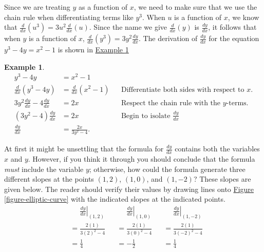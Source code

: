 \documentclass[12pt,]{book}
\theoremstyle{plain}
\theoremstyle{definition}
\newtheorem{example}[theorem]{Example}
\numberwithin{equation}{section}
\newcommand{\point}[2]{\left(#1,#2\right)}
\newcommand{\lz}[2]{\frac{d#1}{d#2}}
\newcommand{\lzoo}[2]{{\frac{d}{d#1}}{\left(#2\right)}}
\newcommand{\lzoa}[3]{\left.{\frac{d#1}{d#2}}\right|_{#3}}
\begin{document}
\par
Since we are treating \(y\) as a function of \(x\), we need to make sure that we use the chain rule when differentiating terms like \(y^3\).  When \(u\) is a function of \(x\), we know that \(\lzoo{x}{u^3}=3u^2\lzoo{x}{u}\). Since the name we give \(\lzoo{x}{y}\) is \(\lz{y}{x}\), it follows that when \(y\) is a function of \(x\), \(\lzoo{x}{y^3}=3y^2\lz{y}{x}\). The derivation of \(\lz{y}{x}\) for the equation \(y^3-4y=x^2-1\) is shown in \hyperref[example-implicit-differentiation]{Example \ref{example-implicit-differentiation}}%
\begin{example}\label{example-implicit-differentiation}
\begin{align*}
y^3-4y&=x^2-1\\
\lzoo{x}{y^3-4y}&=\lzoo{x}{x^2-1}&&\text{Differentiate both sides with respect to $x$.}\\
3y^2\lz{y}{x}-4\lz{y}{x}&=2x&&\text{Respect the chain rule with the $y$-terms.}\\
\left(3y^2-4\right)\lz{y}{x}&=2x&&\text{Begin to isolate $\lz{y}{x}$}\\
\lz{y}{x}&=\frac{2x}{3y^2-4}.
\end{align*}%
\end{example}
\par
At first it might be unsettling that the formula for \(\lz{y}{x}\) contains both the variables \(x\) and \(y\). However, if you think it through you should conclude that the formula \emph{must} include the variable \(y\); otherwise, how could the formula generate three different slopes at the points \(\point{1}{2}\), \(\point{1}{0}\), and \(\point{1}{-2}\)?  These slopes are given below.  The reader should verify their values by drawing lines onto \hyperref[figure-elliptic-curve]{Figure \ref{figure-elliptic-curve}} with the indicated slopes at the indicated points.\begin{align*}
&\phantom{{}={}}\lzoa{y}{x}{\point{1}{2}}&&\phantom{{}={}}\lzoa{y}{x}{\point{1}{0}}&&\phantom{{}={}}\lzoa{y}{x}{\point{1}{-2}}\\
&=\frac{2(1)}{3(2)^2-4}&&=\frac{2(1)}{3(0)^2-4}&&=\frac{2(1)}{3(-2)^2-4}\\
&=\frac{1}{4}&&=-\frac{1}{2}&&=\frac{1}{4}
\end{align*}%
\typeout{************************************************}
\typeout{************************************************}
\end{document}
